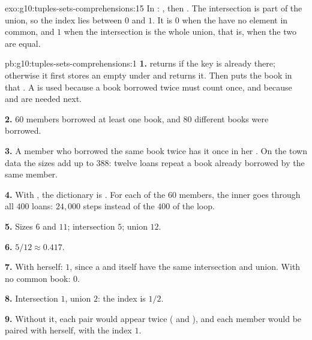 \begin{solution}{exo:g10:tuples-sets-comprehensions:15}
In : , then
. The intersection is part of the union, so the index lies between
$0$ and $1$. It is $0$ when the  have no element in common, and $1$ when the intersection is the whole union, that
is, when the two  are equal.
\end{solution}

\begin{solution}{pb:g10:tuples-sets-comprehensions:1}
\textbf{1.}  returns  if the key  is already there; otherwise
it first stores an empty  under  and returns it. Then  puts the book in that . A  is
used because a book borrowed twice must count once, and because \code{&} and \code{|} are needed next.

\textbf{2.} $60$ members borrowed at least one book, and $80$ different books were borrowed.

\textbf{3.} A member who borrowed the same book twice has it once in her . On the town data the sizes add up to
$388$: twelve loans repeat a book already borrowed by the same member.

\textbf{4.} With , the dictionary is
. For each of the $60$ members, the inner  goes through all $400$ loans: $24{,}000$ steps
instead of the $400$ of the loop.

\textbf{5.} Sizes $6$ and $11$; intersection $5$; union $12$.

\textbf{6.} $5/12 \approx 0.417$.

\textbf{7.} With herself: $1$, since a  and itself have the same intersection and union. With no common book: $0$.

\textbf{8.} Intersection $1$, union $2$: the index is $1/2$.

\textbf{9.} Without it, each pair would appear twice ( and ), and each member would be paired
with herself, with the index $1$.


\end{solution}
